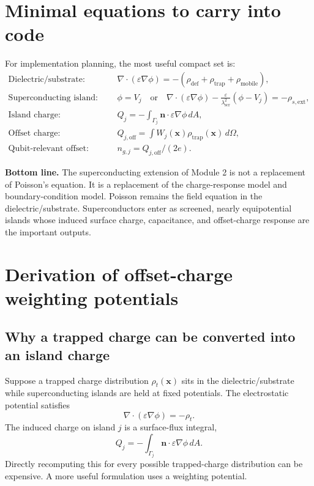 \documentclass[11pt]{article}
\newcommand{\nvecb}{\mathbf{n}}
\newcommand{\rhotrap}{\rho_{\mathrm{trap}}}
\newcommand{\rhodef}{\rho_{\mathrm{def}}}
\newcommand{\lams}{\lambda_{\mathrm{scr}}}
\begin{document}
\section{Minimal equations to carry into code}

For implementation planning, the most useful compact set is:
\begin{align}
\text{Dielectric/substrate:}\qquad
&\nabla\cdot(\varepsilon\nabla\phi)=-\left(\rhodef+\rhotrap+\rho_{\mathrm{mobile}}\right),\\
\text{Superconducting island:}\qquad
&\phi=V_j\quad\text{or}\quad
\nabla\cdot(\varepsilon\nabla\phi)-\frac{\varepsilon}{\lams^2}(\phi-V_j)=-\rho_{s,\mathrm{ext}},\\
\text{Island charge:}\qquad
&Q_j=-\int_{\Gamma_j}\nvecb\cdot\varepsilon\nabla\phi\,dA,\\
\text{Offset charge:}\qquad
&Q_{j,\mathrm{off}}=\int W_j(\mathbf{x})\rho_{\mathrm{trap}}(\mathbf{x})\,d\Omega,\\
\text{Qubit-relevant offset:}\qquad
&n_{g,j}=Q_{j,\mathrm{off}}/(2e).
\end{align}

\begin{physicsbox}
\textbf{Bottom line.} The superconducting extension of Module 2 is not a replacement of Poisson's equation. It is a replacement of the charge-response model and boundary-condition model. Poisson remains the field equation in the dielectric/substrate. Superconductors enter as screened, nearly equipotential islands whose induced surface charge, capacitance, and offset-charge response are the important outputs.
\end{physicsbox}


\section{Derivation of offset-charge weighting potentials}

\subsection{Why a trapped charge can be converted into an island charge}

Suppose a trapped charge distribution $\rho_t(\mathbf{x})$ sits in the dielectric/substrate while superconducting islands are held at fixed potentials. The electrostatic potential satisfies
\begin{equation}
\nabla\cdot(\varepsilon\nabla\phi)=-\rho_t.
\end{equation}
The induced charge on island $j$ is a surface-flux integral,
\begin{equation}
Q_j=-\int_{\Gamma_j}\nvecb\cdot\varepsilon\nabla\phi\,dA.
\end{equation}
Directly recomputing this for every possible trapped-charge distribution can be expensive. A more useful formulation uses a weighting potential.
\end{document}
